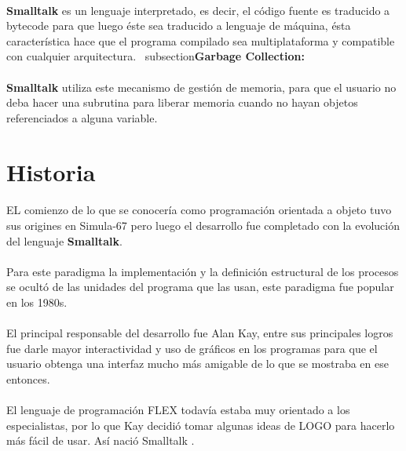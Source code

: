 \documentclass[11pt]{article}
\begin{document}
\paragraph{} \noindent
\textbf{Smalltalk} es un lenguaje interpretado, es decir, el código fuente es traducido a bytecode para que luego éste sea traducido a lenguaje de máquina, ésta característica hace que el programa compilado sea multiplataforma y compatible con cualquier arquitectura.
\ subsection{\textbf{Garbage Collection:}}
\paragraph{} \noindent
\textbf{Smalltalk} utiliza este mecanismo de gestión de memoria, para que el usuario no deba hacer una subrutina para liberar memoria cuando no hayan objetos referenciados a alguna variable.
\section{\textbf{Historia}}
\paragraph{} \noindent
EL comienzo de lo que se conocería como programación orientada a objeto tuvo sus origines en Simula-67 pero luego el desarrollo fue completado con la evolución del lenguaje \textbf{Smalltalk}.
\paragraph{} \noindent
Para este paradigma la implementación y la definición estructural de los procesos se ocultó de las unidades del programa que las usan, este paradigma fue popular en los 1980s.
\paragraph{} \noindent
El principal responsable del desarrollo fue Alan Kay, entre sus principales logros fue darle mayor interactividad y uso de gráficos en los programas para que el usuario obtenga una interfaz mucho más amigable de lo que se mostraba en ese entonces.
\paragraph{} \noindent
El lenguaje de programación FLEX todavía estaba muy orientado a los especialistas, por lo que Kay decidió tomar algunas ideas de LOGO para hacerlo más fácil de usar. Así nació Smalltalk \cite{cinvestav}.
\end{document}
